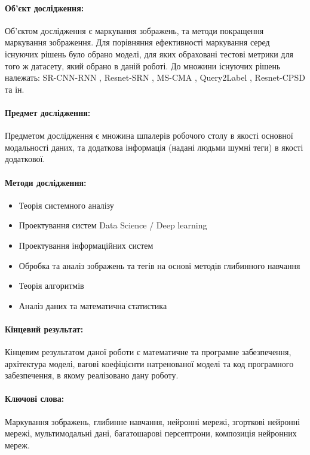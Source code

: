\documentclass{udstu}
\begin{document}
\paragraph{\textbf{Об'єкт дослідження:}}
Об'єктом дослідження є маркування зображень, та методи покращення маркування зображення.
Для порівняння ефективності маркування серед існуючих рішень було обрано моделі,
для яких обраховані тестові метрики для того ж датасету, який обрано в даній роботі.
До множини існуючих рішень належать: SR-CNN-RNN \cite{sr-cnn-rnn}, Resnet-SRN \cite{srn},
MS-CMA \cite{cma}, Query2Label \cite{q2l}, Resnet-CPSD \cite{cpsd} та ін.

\paragraph{\textbf{Предмет дослідження:}}
Предметом дослідження є множина шпалерів робочого столу в якості основної модальності даних,
та додаткова інформація (надані людьми шумні теги) в якості додаткової.

\paragraph{\textbf{Методи дослідження:}}
\begin{itemize}[*]
	\item Теорія системного аналізу
	\item Проектування систем Data Science / Deep learning
	\item Проектування інформаційних систем
	\item Обробка та аналіз зображень та тегів на основі методів глибинного навчання
	\item Теорія алгоритмів
	\item Аналіз даних та математична статистика
\end{itemize}

\paragraph{\textbf{Кінцевий результат:}}
Кінцевим результатом даної роботи є математичне та програмне забезпечення, архітектура моделі,
вагові коефіцієнти натренованої моделі та код програмного забезпечення, в якому реалізовано дану роботу.

\paragraph{\textbf{Ключові слова:}}
Маркування зображень, глибинне навчання, нейронні мережі, згорткові нейронні мережі,
мультимодальні дані, багатошарові персептрони, композиція нейронних мереж.
\end{document}
